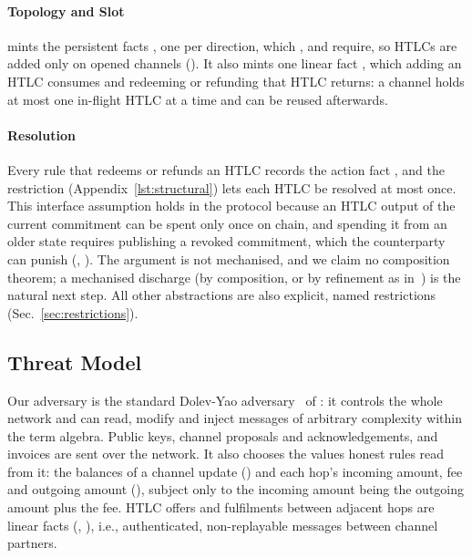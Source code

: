 \paragraph{Topology and Slot}  mints the persistent facts
, one per direction, which , 
and  require, so HTLCs are added only on opened channels
(). It also mints one linear fact , which adding an
HTLC consumes and redeeming or refunding that HTLC returns: a channel holds at most one
in-flight HTLC at a time and can be reused afterwards.

\paragraph{Resolution} Every rule that redeems or refunds an HTLC records the action fact
, and the restriction  (Appendix~\ref{lst:structural}) lets
each HTLC be resolved at most once. This interface assumption holds in the protocol because an
HTLC output of the current commitment can be spent only once on chain, and spending it from an
older state requires publishing a revoked commitment, which the counterparty can punish
(, ). The argument is not mechanised, and we claim no
composition theorem; a mechanised discharge (by composition, or by refinement as
in~\cite{grundmann2026}) is the natural next step. All other abstractions are also explicit,
named restrictions (Sec.~\ref{sec:restrictions}).

\subsection{Threat Model}\label{sec:threat}

Our adversary is the standard Dolev-Yao adversary~\cite{dolevyao1983} of \tamarin{}: it
controls the whole network and can read, modify and inject messages of arbitrary
complexity within the term algebra. Public keys, channel proposals and acknowledgements, and
invoices are sent over the network. It also chooses the values honest rules read from it: the
balances of a channel update () and each hop's incoming amount, fee and
outgoing amount (), subject only to the incoming amount being the outgoing
amount plus the fee. HTLC offers and fulfilments between adjacent hops are linear facts
(, ), i.e., authenticated, non-replayable messages between channel
partners.

